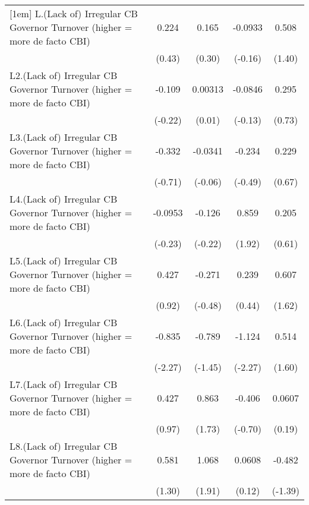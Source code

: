 {\begin{longtable}{l*{4}{c}}
[1em]
L.(Lack of) Irregular CB Governor Turnover (higher = more de facto CBI)&    0.224         &    0.165         &  -0.0933         &    0.508         \\
                &   (0.43)         &   (0.30)         &  (-0.16)         &   (1.40)         \\
[1em]
L2.(Lack of) Irregular CB Governor Turnover (higher = more de facto CBI)&   -0.109         &  0.00313         &  -0.0846         &    0.295         \\
                &  (-0.22)         &   (0.01)         &  (-0.13)         &   (0.73)         \\
[1em]
L3.(Lack of) Irregular CB Governor Turnover (higher = more de facto CBI)&   -0.332         &  -0.0341         &   -0.234         &    0.229         \\
                &  (-0.71)         &  (-0.06)         &  (-0.49)         &   (0.67)         \\
[1em]
L4.(Lack of) Irregular CB Governor Turnover (higher = more de facto CBI)&  -0.0953         &   -0.126         &    0.859         &    0.205         \\
                &  (-0.23)         &  (-0.22)         &   (1.92)         &   (0.61)         \\
[1em]
L5.(Lack of) Irregular CB Governor Turnover (higher = more de facto CBI)&    0.427         &   -0.271         &    0.239         &    0.607         \\
                &   (0.92)         &  (-0.48)         &   (0.44)         &   (1.62)         \\
[1em]
L6.(Lack of) Irregular CB Governor Turnover (higher = more de facto CBI)&   -0.835\sym{*}  &   -0.789         &   -1.124\sym{*}  &    0.514         \\
                &  (-2.27)         &  (-1.45)         &  (-2.27)         &   (1.60)         \\
[1em]
L7.(Lack of) Irregular CB Governor Turnover (higher = more de facto CBI)&    0.427         &    0.863         &   -0.406         &   0.0607         \\
                &   (0.97)         &   (1.73)         &  (-0.70)         &   (0.19)         \\
[1em]
L8.(Lack of) Irregular CB Governor Turnover (higher = more de facto CBI)&    0.581         &    1.068         &   0.0608         &   -0.482         \\
                &   (1.30)         &   (1.91)         &   (0.12)         &  (-1.39)         \\

\end{longtable}}
